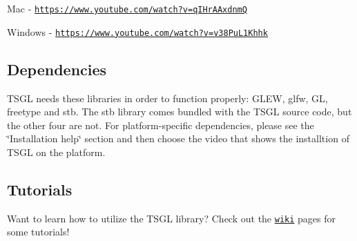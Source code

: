 Mac -\/ \href{https://www.youtube.com/watch?v=qIHrAAxdnmQ}{\tt https\-://www.\-youtube.\-com/watch?v=q\-I\-Hr\-A\-Axdnm\-Q}

Windows -\/ \href{https://www.youtube.com/watch?v=v38PuL1Khhk}{\tt https\-://www.\-youtube.\-com/watch?v=v38\-Pu\-L1\-Khhk} 

 \subsection*{Dependencies }

T\-S\-G\-L needs these libraries in order to function properly\-: G\-L\-E\-W, glfw, G\-L, freetype and stb. The stb library comes bundled with the T\-S\-G\-L source code, but the other four are not. For platform-\/specific dependencies, please see the \char`\"{}\-Installation help\char`\"{} section and then choose the video that shows the installtion of T\-S\-G\-L on the platform. 

 \subsection*{Tutorials }

Want to learn how to utilize the T\-S\-G\-L library? Check out the \href{https://github.com/Calvin-CS/TSGL/wiki}{\tt wiki} pages for some tutorials! 